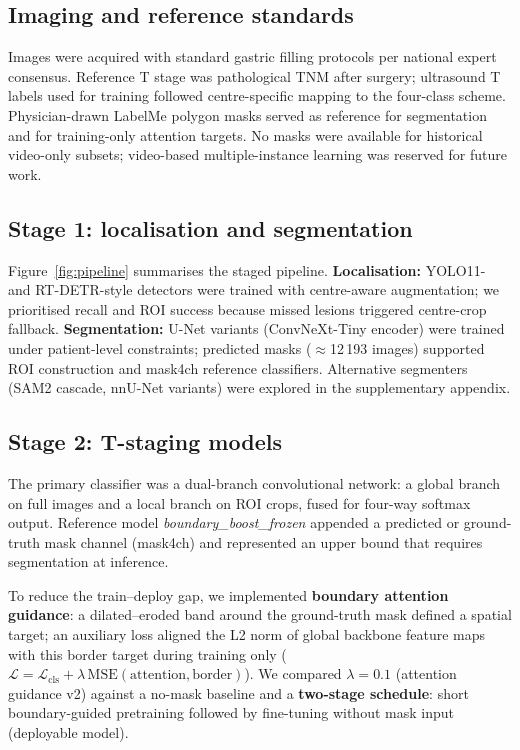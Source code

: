 \documentclass[11pt,a4paper]{article}
\begin{document}
\subsection{Imaging and reference standards}
Images were acquired with standard gastric filling protocols per national expert consensus.\cite{oral_contrast_expert2020} Reference T stage was pathological TNM after surgery; ultrasound T labels used for training followed centre-specific mapping to the four-class scheme. Physician-drawn LabelMe polygon masks served as reference for segmentation and for training-only attention targets. No masks were available for historical video-only subsets; video-based multiple-instance learning was reserved for future work.

\subsection{Stage 1: localisation and segmentation}
Figure~\ref{fig:pipeline} summarises the staged pipeline. \textbf{Localisation:} YOLO11- and RT-DETR-style detectors were trained with centre-aware augmentation; we prioritised recall and ROI success because missed lesions triggered centre-crop fallback. \textbf{Segmentation:} U-Net variants (ConvNeXt-Tiny encoder) were trained under patient-level constraints; predicted masks ($\approx$12\,193 images) supported ROI construction and mask4ch reference classifiers. Alternative segmenters (SAM2 cascade, nnU-Net variants) were explored in the supplementary appendix.

\subsection{Stage 2: T-staging models}
The primary classifier was a dual-branch convolutional network: a global branch on full images and a local branch on ROI crops, fused for four-way softmax output. Reference model \textit{boundary\_boost\_frozen} appended a predicted or ground-truth mask channel (mask4ch) and represented an upper bound that requires segmentation at inference.

To reduce the train--deploy gap, we implemented \textbf{boundary attention guidance}: a dilated--eroded band around the ground-truth mask defined a spatial target; an auxiliary loss aligned the L2 norm of global backbone feature maps with this border target during training only ($\mathcal{L}=\mathcal{L}_{\mathrm{cls}}+\lambda\,\mathrm{MSE}(\mathrm{attention},\mathrm{border})$). We compared $\lambda{=}0.1$ (attention guidance v2) against a no-mask baseline and a \textbf{two-stage schedule}: short boundary-guided pretraining followed by fine-tuning without mask input (deployable model).
\end{document}
